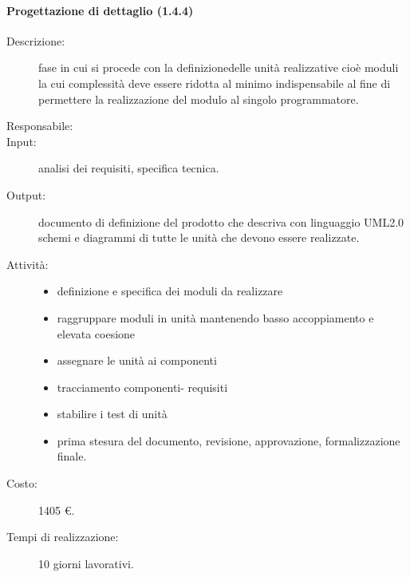 \paragraph{Progettazione di dettaglio (1.4.4)}
\begin{description}
\item[Descrizione:] fase in cui si procede con la definizionedelle unità realizzative cioè moduli la cui complessità deve essere ridotta al minimo indispensabile al fine di permettere la realizzazione del modulo al singolo programmatore.
\item[Responsabile:] 
\item[Input:] analisi dei requisiti, specifica tecnica.
\item[Output:] documento di definizione del prodotto che descriva con linguaggio UML2.0 schemi e diagrammi di tutte le unità che devono essere realizzate.
\item[Attività:] 
\begin{center}
\begin{itemize}
\item definizione e specifica dei moduli da realizzare
\item raggruppare moduli in unità mantenendo basso accoppiamento e elevata coesione
\item assegnare le unità ai componenti
\item tracciamento componenti- requisiti
\item stabilire i test di unità
\item prima stesura del documento, revisione, approvazione, formalizzazione finale.
\end{itemize}
\end{center}
\item[Costo:] 1405 \euro{}.
\item[Tempi di realizzazione:] 10 giorni lavorativi.
\end{description}

